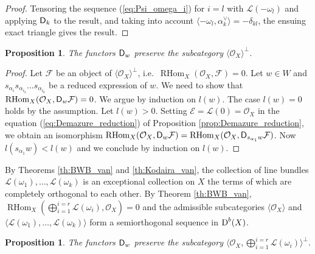 \documentclass[sn-mathphys-num]{sn-jnl}%
\newcommand{\Oo}{\mathcal O}
\newcommand{\Ff}{\mathcal F}
\newcommand{\Ee}{\mathcal E}
\newcommand{\Ll}{\mathcal L}
\newcommand*{\Dd}{\mathop{\mathrm D\kern0pt}\nolimits}
\newcommand*{\RHom}{\mathop{\mathrm {RHom}}\nolimits}
\newcommand{\sd}{\sf D}
\newtheorem{proposition}[theorem]{Proposition}
\theoremstyle{definition}
\begin{document}
\begin{proof}
Tensoring the sequence (\ref{eq:Psi_omega_i}) for $i=l$ with $\Ll (-\omega _l)$ and applying ${\sf D}_k$ to the result, and taking into account $\langle -\omega _l,\alpha _k^{\vee}\rangle =-\delta _{kl}$, the ensuing exact triangle gives the result.
\end{proof}

\begin{proposition}\label{prop:Demfunpreserveorthogonal-0}
The functors ${\sd}_w$ preserve the subcategory $\langle \Oo _{X}\rangle ^{\perp}$.
\end{proposition}

\begin{proof}
Let $\Ff$ be an object of $\langle \Oo _{X}\rangle ^{\perp}$, i.e.\ $\RHom _X(\Oo _X,\Ff)=0$. Let $w\in W$ and $s_{\alpha _i}s_{\alpha _{i_2}}\dots s_{\alpha _{i_k}}$ be a reduced expression of $w$. We need to show that $\RHom _X(\Oo _X,{\sd}_w\Ff)=0$. We argue by induction on $l(w)$. The case $l(w)=0$ holds by the assumption. Let $l(w)>0$. Setting $\Ee =\Ll (0)=\Oo _X$ in the equation (\ref{eq:Demazure_reduction}) of Proposition \ref{prop:Demazure_reduction}, we obtain an isomorphism $\RHom _X(\Oo _X,{\sd}_w\Ff)=\RHom _X(\Oo _X,{\sd}_{s_{\alpha _1}w}\Ff)$. Now $l(s_{\alpha _1}w)<l(w)$ and we conclude by induction on $l(w)$.
\end{proof}

By Theorems \ref{th:BWB_van} and \ref{th:Kodaira_van}, the collection of line bundles $\Ll(\omega _1),\dots ,\Ll(\omega _k)$ is an exceptional collection on $X$ the terms of which are completely orthogonal to each other. By Theorem \ref{th:BWB_van}, $\RHom _X(\bigoplus _{i=1}^{i=r}\Ll(\omega _i),\Oo _X)=0$ and the admissible subcategories $\langle \Oo _X\rangle$ and $\langle \Ll(\omega _1),\dots ,\Ll(\omega _k)\rangle$  form a semiorthogonal sequence in $\Dd ^b(X)$.

\begin{proposition}\label{prop:Demfunpreserveorthogonal-Pic}
The functors ${\sd}_w$ preserve the subcategory $\langle \Oo _{X},  \bigoplus _{i=1}^{i=r}\Ll(\omega _i)\rangle ^{\perp}$.
\end{proposition}
\end{document}
